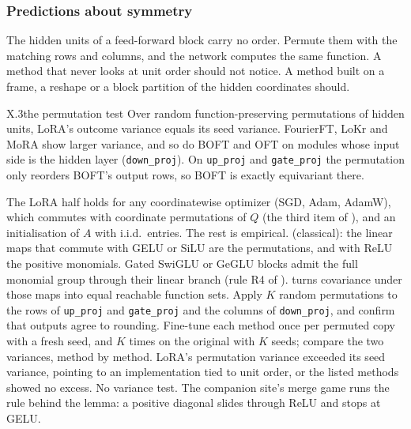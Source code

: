 \subsubsection{Predictions about symmetry}\label{sec:predictions-symmetry}

The hidden units of a feed-forward block carry no order. Permute them with the matching rows and columns, and the network
computes the same function. A method that never looks at unit order should not notice. A method built on a frame, a
reshape or a block partition of the hidden coordinates should.

\begin{prediction}{X.3}{the permutation test}
Over random function-preserving permutations of hidden units, LoRA's outcome variance equals its seed variance.
FourierFT, LoKr and MoRA show larger variance, and so do BOFT and OFT on modules whose input side is the hidden layer
(\texttt{down\_proj}). On \texttt{up\_proj} and \texttt{gate\_proj} the permutation only reorders BOFT's output rows, so
BOFT is exactly equivariant there.
\begin{predmeta}
   The LoRA half holds for any coordinatewise optimizer (SGD, Adam, AdamW), which commutes with
    coordinate permutations of $Q$ (the third item of ), and an initialisation of $A$ with i.i.d.\ entries. The
    rest is empirical.
    (classical): the linear maps that commute with GELU or SiLU are the
    permutations, and with ReLU the positive monomials. Gated SwiGLU or GeGLU blocks admit the full monomial group
    through their linear branch (rule R4 of ).  turns covariance under
    those maps into equal reachable function sets.
   Apply $K$ random permutations to the rows of \texttt{up\_proj} and \texttt{gate\_proj} and the
    columns of \texttt{down\_proj}, and confirm that outputs agree to rounding. Fine-tune each method once per permuted
    copy with a fresh seed, and $K$ times on the original with $K$ seeds; compare the two variances, method by method.
   LoRA's permutation variance exceeded its seed variance, pointing to an implementation tied
    to unit order, or the listed methods showed no excess.
   No variance test. The companion site's merge game runs the rule behind the lemma: a positive diagonal
    slides through ReLU and stops at GELU.
\end{predmeta}
\end{prediction}

